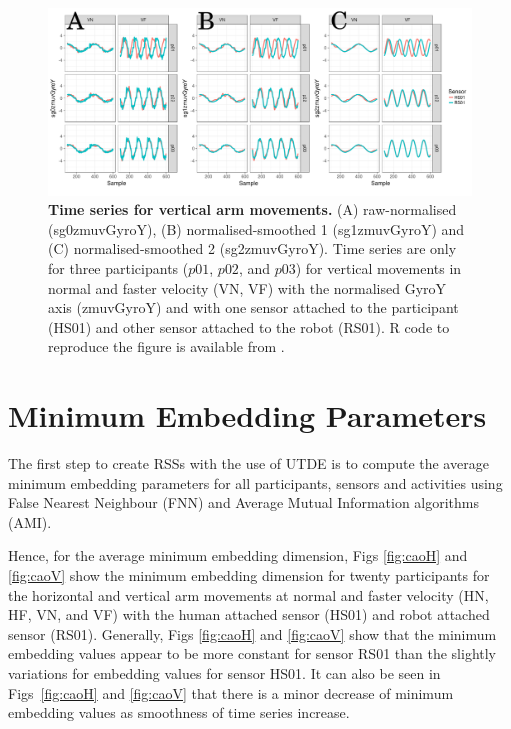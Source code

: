 \begin{figure}[!h]
  \centering
\includegraphics[width=1.0\textwidth]{tsVv03}
	\caption{ 
	{\bf Time series for vertical arm movements.}
		(A) raw-normalised (sg0zmuvGyroY), 
		(B) normalised-smoothed 1 (sg1zmuvGyroY) and
		(C) normalised-smoothed 2 (sg2zmuvGyroY).
		Time series are only for three participants 
		($p01$, $p02$, and $p03$) 
		for vertical movements in normal and faster velocity (VN, VF) 
		with the normalised GyroY axis (zmuvGyroY) 
		and with one sensor attached to the participant (HS01) 
		and other sensor attached to the robot (RS01).
		R code to reproduce the figure is available 
		from \cite{hwum2018}.
        }
    \label{fig:tsV}
\end{figure}







\section{Minimum Embedding Parameters}
The first step to create RSSs with the use of UTDE is to compute the
average minimum embedding parameters for all participants, sensors and 
activities using False Nearest Neighbour (FNN) and 
Average Mutual Information algorithms (AMI).

Hence, for the average minimum embedding dimension, 
Figs \ref{fig:caoH} and \ref{fig:caoV} show the minimum embedding 
dimension for twenty participants for the horizontal and vertical arm
movements at normal and faster velocity (HN, HF, VN, and VF) with the 
human attached sensor (HS01) and robot attached sensor (RS01).
Generally, Figs \ref{fig:caoH} and \ref{fig:caoV} show that the minimum 
embedding values appear to be more constant for sensor RS01 than the 
slightly variations for embedding values for sensor HS01.
It can also be seen in Figs~\ref{fig:caoH} and \ref{fig:caoV} that there 
is a minor decrease of minimum embedding values as smoothness of time 
series increase. 


